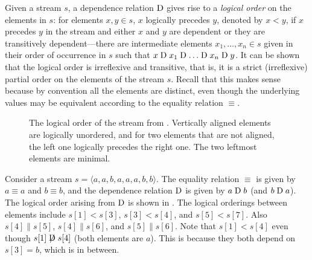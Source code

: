 Given a stream $s$, a dependence relation
$\mathrel{\mathrm{D}}$ gives rise to a \emph{logical order} on the elements in $s$:
for elements $x,y\in s$, $x$ logically precedes $y$, denoted by $x<y$,
if $x$ precedes $y$ in the stream and either $x$ and $y$ are dependent or they
are transitively dependent---there are intermediate elements $x_1, \ldots,
x_n\in s$ given in their order of occurrence in $s$ such that
$x\mathrel{\mathrm{D}} x_1 \mathrel{\mathrm{D}} \ldots \mathrel{\mathrm{D}} x_n \mathrel{\mathrm{D}} y$. It can be shown that the logical
order is irreflexive and transitive, that is, it is a strict (irreflexive) partial order
on the elements of the stream $s$.
Recall that this makes sense because by convention all the elements are distinct, even though the underlying values may be equivalent according to the equality relation $\equiv$.

\begin{figure}[t]
  \centering
  \caption[Example logical order of a stream.]{The logical order of the stream from .
  Vertically aligned elements are logically unordered, and for two elements
  that are not aligned, the left one logically precedes
  the right one. The two leftmost elements are minimal.}
  \label{diffstream:fig:logical-order}
\end{figure}

\begin{example}\label{diffstream:ex:logical-order}
  Consider a stream $s=\langle a, a, b, a, a, a, b, b \rangle$.
  The equality relation $\equiv$
  is given by $a\equiv a$ and $b\equiv b$, and the dependence relation
  $\mathrel{\mathrm{D}}$ is given
  by $a \mathrel{\mathrm{D}} b$ (and $b \mathrel{\mathrm{D}} a$). The logical order arising from $\mathrel{\mathrm{D}}$ is shown in
  . The logical orderings between elements
  include $s[1] < s[3]$, $s[3]<s[4]$, and $s[5]<s[7]$. Also $s[4]\parallel
  s[5]$, $s[4]\parallel s[6]$, and $s[5] \parallel s[6]$. Note that
  $s[1] < s[4]$ even though $s[1] \not\mathrel{\mathrm{D}} s[4]$ (both elements are $a$).
  This is because they both depend on $s[3]=b$, which is in between.
\end{example}

